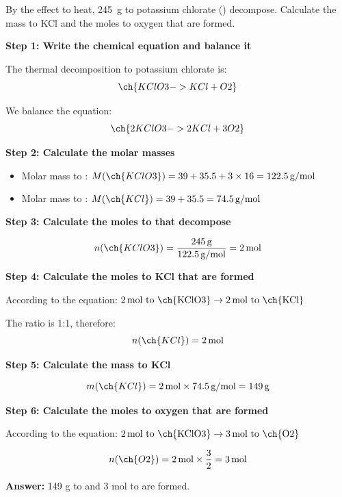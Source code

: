\begin{exercise}
    By the effect to heat, \qty{245}{\g} to potassium chlorate () decompose. Calculate the mass to KCl and the moles to oxygen that are formed.
    \begin{solu}
        \textbf{Step 1: Write the chemical equation and balance it}

        The thermal decomposition to potassium chlorate is:
        \begin{equation*}
            \ch{KClO3 -> KCl + O2}
        \end{equation*}

        We balance the equation:
        \begin{equation*}
            \ch{2 KClO3 -> 2 KCl + 3 O2}
        \end{equation*}

        \textbf{Step 2: Calculate the molar masses}

        \begin{itemize}
            \item Molar mass to : $M(\ch{KClO3}) = 39 + 35.5 + 3 \times 16 = 122.5\,\text{g/mol}$
            \item Molar mass to : $M(\ch{KCl}) = 39 + 35.5 = 74.5\,\text{g/mol}$
        \end{itemize}

        \textbf{Step 3: Calculate the moles to  that decompose}

        \begin{equation*}
            n(\ch{KClO3}) = \frac{245\,\text{g}}{122.5\,\text{g/mol}} = 2\,\text{mol}
        \end{equation*}

        \textbf{Step 4: Calculate the moles to KCl that are formed}

        According to the equation: $2\,\text{mol to \ch{KClO3}} \rightarrow 2\,\text{mol to \ch{KCl}}$

        The ratio is 1:1, therefore:
        \begin{equation*}
            n(\ch{KCl}) = 2\,\text{mol}
        \end{equation*}

        \textbf{Step 5: Calculate the mass to KCl}

        \begin{equation*}
            m(\ch{KCl}) = 2\,\text{mol} \times 74.5\,\text{g/mol} = 149\,\text{g}
        \end{equation*}

        \textbf{Step 6: Calculate the moles to oxygen that are formed}

        According to the equation: $2\,\text{mol to \ch{KClO3}} \rightarrow 3\,\text{mol to \ch{O2}}$

        \begin{equation*}
            n(\ch{O2}) = 2\,\text{mol} \times \frac{3}{2} = 3\,\text{mol}
        \end{equation*}

        \textbf{Answer:} 149 g to  and 3 mol to  are formed.
    \end{solu}
\end{exercise}

